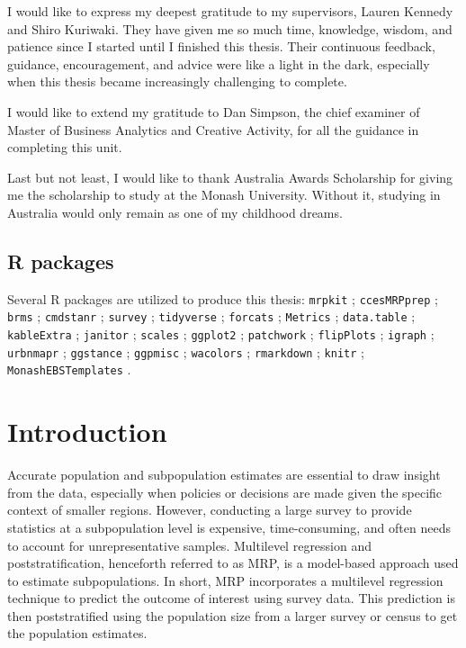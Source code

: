 \documentclass{monashthesis}
\begin{document}
I would like to express my deepest gratitude to my supervisors, Lauren Kennedy and Shiro Kuriwaki. They have given me so much time, knowledge, wisdom, and patience since I started until I finished this thesis. Their continuous feedback, guidance, encouragement, and advice were like a light in the dark, especially when this thesis became increasingly challenging to complete.

I would like to extend my gratitude to Dan Simpson, the chief examiner of Master of Business Analytics and Creative Activity, for all the guidance in completing this unit.

Last but not least, I would like to thank Australia Awards Scholarship for giving me the scholarship to study at the Monash University. Without it, studying in Australia would only remain as one of my childhood dreams.

\hypertarget{r-packages}{%
\section*{R packages}\label{r-packages}}

Several R \autocite{R} packages are utilized to produce this thesis: \texttt{mrpkit} \autocite{mrpkit}; \texttt{ccesMRPprep} \autocite{ccesmrpprep}; \texttt{brms} \autocite{brms}; \texttt{cmdstanr} \autocite{cmdstanr}; \texttt{survey} \autocite{survey}; \texttt{tidyverse} \autocite{tidyverse}; \texttt{forcats} \autocite{forcats}; \texttt{Metrics} \autocite{Metrics}; \texttt{data.table} \autocite{datatable}; \texttt{kableExtra} \autocite{kable}; \texttt{janitor} \autocite{janitor}; \texttt{scales} \autocite{scales}; \texttt{ggplot2} \autocite{ggplot2}; \texttt{patchwork} \autocite{pw}; \texttt{flipPlots} \autocite{flipflops}; \texttt{igraph} \autocite{igraph}; \texttt{urbnmapr} \autocite{urban}; \texttt{ggstance} \autocite{stance}; \texttt{ggpmisc} \autocite{ggpmisc}; \texttt{wacolors} \autocite{wacolors}; \texttt{rmarkdown} \autocite{rmd}; \texttt{knitr} \autocite{knitr}; \texttt{MonashEBSTemplates} \autocite{monashtemp}.

\hypertarget{ch:intro}{%
\chapter{Introduction}\label{ch:intro}}

Accurate population and subpopulation estimates are essential to draw insight from the data, especially when policies or decisions are made given the specific context of smaller regions. However, conducting a large survey to provide statistics at a subpopulation level is expensive, time-consuming, and often needs to account for unrepresentative samples. Multilevel regression and poststratification, henceforth referred to as MRP, is a model-based approach used to estimate subpopulations. In short, MRP incorporates a multilevel regression technique to predict the outcome of interest using survey data. This prediction is then poststratified using the population size from a larger survey or census to get the population estimates.
\end{document}

